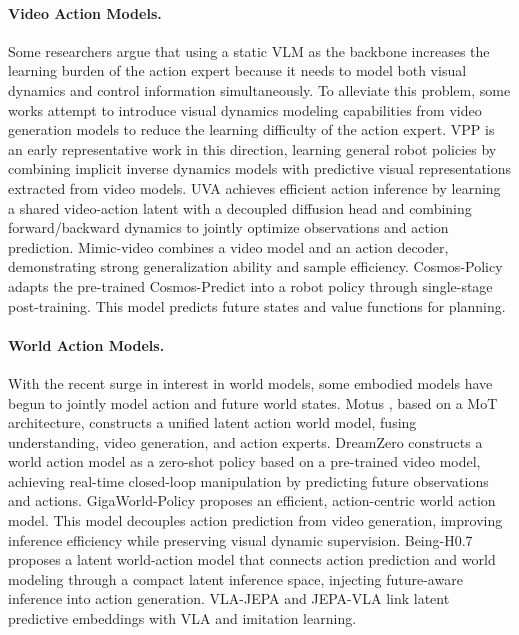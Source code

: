 \paragraph{Video Action Models.}\label{sec:vams}
Some researchers argue that using a static VLM as the backbone increases the learning burden of the action expert because it needs to model both visual dynamics and control information simultaneously. To alleviate this problem, some works attempt to introduce visual dynamics modeling capabilities from video generation models to reduce the learning difficulty of the action expert. VPP \citep{VPP} is an early representative work in this direction, learning general robot policies by combining implicit inverse dynamics models with predictive visual representations extracted from video models. UVA \citep{UVA} achieves efficient action inference by learning a shared video-action latent with a decoupled diffusion head and combining forward/backward dynamics to jointly optimize observations and action prediction. Mimic-video \citep{mimic-video} combines a video model and an action decoder, demonstrating strong generalization ability and sample efficiency. Cosmos-Policy \citep{cosmos-policy} adapts the pre-trained Cosmos-Predict \citep{cosmospredict2.5} into a robot policy through single-stage post-training. This model predicts future states and value functions for planning.



\vspace{-0.5em}
\paragraph{World Action Models.}\label{sec:wams}
With the recent surge in interest in world models, some embodied models have begun to jointly model action and future world states. Motus \citep{motus}, based on a MoT architecture, constructs a unified latent action world model, fusing understanding, video generation, and action experts. DreamZero \citep{DreamZero} constructs a world action model as a zero-shot policy based on a pre-trained video model, achieving real-time closed-loop manipulation by predicting future observations and actions. GigaWorld-Policy \citep{GigaWorld-Policy} proposes an efficient, action-centric world action model. This model decouples action prediction from video generation, improving inference efficiency while preserving visual dynamic supervision. Being-H0.7 \citep{Being-H0.7} proposes a latent world-action model that connects action prediction and world modeling through a compact latent inference space, injecting future-aware inference into action generation. VLA-JEPA \citep{VLA-JEPA} and JEPA-VLA \citep{JEPA-VLA} link latent predictive embeddings with VLA and imitation learning.

